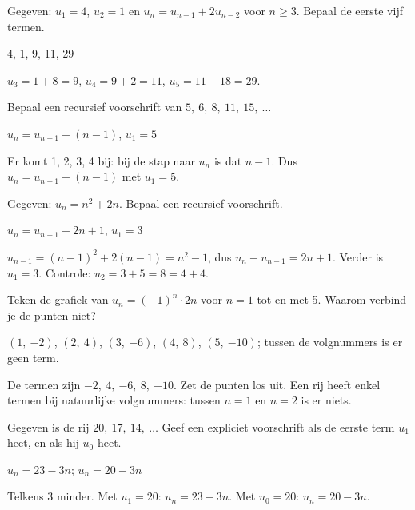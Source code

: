 \begin{oefeningen}
\begin{oefening}[1]\label{oef:h1-t5}
Gegeven: $u_1 = 4$, $u_2 = 1$ en $u_n = u_{n-1} + 2u_{n-2}$ voor $n \geqslant 3$. Bepaal de eerste vijf termen.
\begin{solution}
4, 1, 9, 11, 29
\end{solution}
\begin{fullsolution}
$u_3=1+8=9$, $u_4=9+2=11$, $u_5=11+18=29$.
\end{fullsolution}
\end{oefening}

\begin{oefening}[2]\label{oef:h1-t6}
Bepaal een recursief voorschrift van $5,\ 6,\ 8,\ 11,\ 15,\ \ldots$
\begin{solution}
$u_n=u_{n-1}+(n-1)$, $u_1=5$
\end{solution}
\begin{fullsolution}
Er komt 1, 2, 3, 4 bij: bij de stap naar $u_n$ is dat $n-1$. Dus $u_n=u_{n-1}+(n-1)$ met $u_1=5$.
\end{fullsolution}
\end{oefening}

\begin{oefening}[2]\label{oef:h1-t7}
Gegeven: $u_n = n^2 + 2n$. Bepaal een recursief voorschrift.
\begin{solution}
$u_n=u_{n-1}+2n+1$, $u_1=3$
\end{solution}
\begin{fullsolution}
$u_{n-1}=(n-1)^2+2(n-1)=n^2-1$, dus $u_n-u_{n-1}=2n+1$. Verder is $u_1=3$. Controle: $u_2=3+5=8=4+4$.
\end{fullsolution}
\end{oefening}

\begin{oefening}[1]\label{oef:h1-t8}
Teken de grafiek van $u_n = (-1)^n \cdot 2n$ voor $n = 1$ tot en met 5. Waarom verbind je de punten niet?
\begin{solution}
$(1,\ {-2})$, $(2,\ 4)$, $(3,\ {-6})$, $(4,\ 8)$, $(5,\ {-10})$; tussen de volgnummers is er geen term.
\end{solution}
\begin{fullsolution}
De termen zijn $-2,\ 4,\ {-6},\ 8,\ {-10}$. Zet de punten los uit. Een rij heeft enkel termen bij natuurlijke volgnummers: tussen $n=1$ en $n=2$ is er niets.
\end{fullsolution}
\end{oefening}

\begin{oefening}[2]\label{oef:h1-t9}
Gegeven is de rij $20,\ 17,\ 14,\ \ldots$ Geef een expliciet voorschrift als de eerste term $u_1$ heet, en als hij $u_0$ heet.
\begin{solution}
$u_n=23-3n$; $u_n=20-3n$
\end{solution}
\begin{fullsolution}
Telkens 3 minder. Met $u_1=20$: $u_n=23-3n$. Met $u_0=20$: $u_n=20-3n$.
\end{fullsolution}
\end{oefening}
\end{oefeningen}

